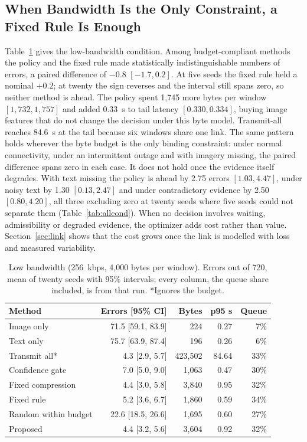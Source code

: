 \documentclass[conference,a4paper]{IEEEtran}
\makeatletter
\newif\ifsubmission
\newcommand{\mtab}[2]{\ifsubmission#2\else Table~\ref{#1}\fi}
\newcommand{\tablelowbw}{%
\begin{table}[t]
\caption{Low bandwidth (256~kbps, 4,000 bytes per window). Errors out of 720, mean of twenty seeds with 95\% intervals; every column, the queue share included, is from that run. *Ignores the budget.}
\label{tab:lowbw}
\centering\scriptsize\setlength{\tabcolsep}{3pt}
\begin{tabular}{@{}lrrrr@{}}
\toprule
Method & Errors [95\% CI] & Bytes & p95 s & Queue \\
\midrule
Image only & 71.5 [59.1, 83.9] & 224 & 0.27 & 7\% \\
Text only & 75.7 [63.9, 87.4] & 196 & 0.26 & 6\% \\
Transmit all* & 4.3 [2.9, 5.7] & 423,502 & 84.64 & 33\% \\
Confidence gate & 7.0 [5.0, 9.0] & 1,063 & 0.47 & 30\% \\
Fixed compression & 4.4 [3.0, 5.8] & 3,840 & 0.95 & 32\% \\
Fixed rule & 5.2 [3.6, 6.7] & 1,860 & 0.59 & 34\% \\
Random within budget & 22.6 [18.5, 26.6] & 1,695 & 0.60 & 27\% \\
Proposed & 4.4 [3.2, 5.6] & 3,604 & 0.92 & 32\% \\
\bottomrule
\end{tabular}
\end{table}
}
\makeatother
\begin{document}
\subsection{When Bandwidth Is the Only Constraint, a Fixed Rule Is Enough}
Table~\ref{tab:lowbw} gives the low-bandwidth condition. Among budget-compliant methods the policy and the fixed rule made statistically indistinguishable numbers of errors, a paired difference of $-0.8$ $[-1.7, 0.2]$. At five seeds the fixed rule held a nominal $+0.2$; at twenty the sign reverses and the interval still spans zero, so neither method is ahead. The policy spent 1,745 more bytes per window $[1{,}732, 1{,}757]$ and added 0.33~s to tail latency $[0.330, 0.334]$, buying image features that do not change the decision under this byte model. Transmit-all reaches 84.6~s at the tail because six windows share one link. The same pattern holds wherever the byte budget is the only binding constraint: under normal connectivity, under an intermittent outage and with imagery missing, the paired difference spans zero in each case. It does not hold once the evidence itself degrades. With text missing the policy is ahead by 2.75 errors $[1.03, 4.47]$, under noisy text by 1.30 $[0.13, 2.47]$ and under contradictory evidence by 2.50 $[0.80, 4.20]$, all three excluding zero at twenty seeds where five seeds could not separate them (\mtab{tab:allcond}{every condition is tabulated in the package}). When no decision involves waiting, admissibility or degraded evidence, the optimizer adds cost rather than value. Section~\ref{sec:link} shows that the cost grows once the link is modelled with loss and measured variability.

\tablelowbw
\end{document}
